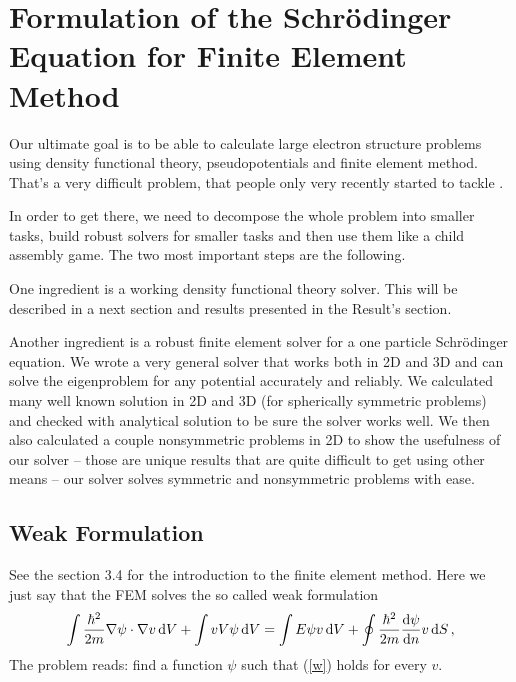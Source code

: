 \section{Formulation of the Schr\"odinger Equation for Finite Element Method}

Our ultimate goal is to be able to calculate large electron structure problems
using density functional theory, pseudopotentials and finite element method.
That's a very difficult problem, that people only very recently started to
tackle \cite{pask1, pask2, ortiz1, ortiz2}.

In order to get there, we need to decompose the whole problem into smaller
tasks, build robust solvers for smaller tasks and then use them like a child
assembly game. The two most important steps are the following.

One ingredient is a working density functional theory solver. This will be
described in a next section and results presented in the Result's section.

Another ingredient is a robust finite element solver for a one particle
Schr\"odinger equation. We wrote a very general solver that works both in 2D
and 3D and can solve the eigenproblem for any potential accurately and
reliably. We calculated many well known solution in 2D and 3D (for spherically
symmetric problems) and checked with analytical solution to be sure the solver
works well. We then also calculated a couple nonsymmetric problems in 2D to
show the usefulness of our solver -- those are unique results that are quite
difficult to get using other means -- our solver solves symmetric and
nonsymmetric problems with ease.

\subsection{Weak Formulation}

See the section 3.4 for the introduction to the finite element method. Here we
just say that the FEM solves the so called weak formulation
\begin{equation}
  \int{\hbar^2\over2m}\nabla\psi\cdot\nabla v\,{\rm d} V+ \int vV\psi\,{\rm d} V = \int E\psi v\,{\rm d} V + \oint{\hbar^2\over2m}{{\rm d}\psi\over{\rm d}n}v\,{\rm d} S\,,  \label{w}
\end{equation}
The problem reads: find a function $\psi$ such that (\ref{w}) holds for every $v$.

